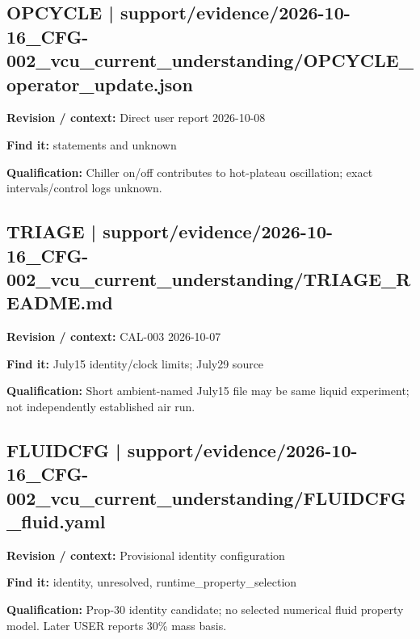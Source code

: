 \documentclass[11pt]{article}
\begin{document}
\par
\par\noindent\begin{minipage}{\textwidth}\small
\subsection*{OPCYCLE | support/evidence/2026-10-16\_\allowbreak{}CFG-002\_\allowbreak{}vcu\_\allowbreak{}current\_\allowbreak{}understanding/OPCYCLE\_\allowbreak{}operator\_\allowbreak{}update.json}
\textbf{Revision / context:} Direct user report 2026-10-08\par
\textbf{Find it:} statements and unknown\par
\textbf{Qualification:} Chiller on/off contributes to hot-plateau oscillation; exact intervals/control logs unknown.\par
\end{minipage}\par\vspace{5pt}
\par\noindent\begin{minipage}{\textwidth}\small
\subsection*{TRIAGE | support/evidence/2026-10-16\_\allowbreak{}CFG-002\_\allowbreak{}vcu\_\allowbreak{}current\_\allowbreak{}understanding/TRIAGE\_\allowbreak{}README.md}
\textbf{Revision / context:} CAL-003 2026-10-07\par
\textbf{Find it:} July15 identity/clock limits; July29 source\par
\textbf{Qualification:} Short ambient-named July15 file may be same liquid experiment; not independently established air run.\par
\end{minipage}\par\vspace{5pt}
\par\noindent\begin{minipage}{\textwidth}\small
\subsection*{FLUIDCFG | support/evidence/2026-10-16\_\allowbreak{}CFG-002\_\allowbreak{}vcu\_\allowbreak{}current\_\allowbreak{}understanding/FLUIDCFG\_\allowbreak{}fluid.yaml}
\textbf{Revision / context:} Provisional identity configuration\par
\textbf{Find it:} identity, unresolved, runtime\_\allowbreak{}property\_\allowbreak{}selection\par
\textbf{Qualification:} Prop-30 identity candidate; no selected numerical fluid property model. Later USER reports 30\% mass basis.\par
\end{minipage}\par\vspace{5pt}
\end{document}
